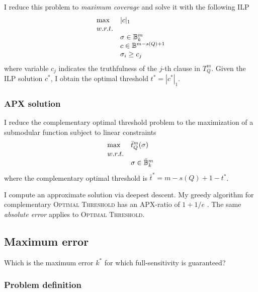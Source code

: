 I reduce this problem to \emph{maximum coverage} \citep{Vazirani2001} and solve it with the following ILP
\begin{equation}
\begin{array}{ll}
\text{max} & |c|_1					\\
w.r.t.							\\
& \sigma \in \mathbb {B}^m_k			\\
& c \in \mathbb {B}^{m - s(Q) + 1}		\\
& \sigma_i \geq c_j				\\
\end{array}
\end{equation}
where variable $c_j$ indicates the truthfulness of the $j$-th clause in $T_{Q}^{m}$. Given the ILP solution $c^*$, I obtain the optimal threshold $t^* = |c^*|_1$.

\subsubsection{APX solution}

I reduce the complementary optimal threshold problem to the maximization of a submodular function subject to linear constraints
\begin{equation}
\begin{array}{ll}
\text{max} & \bar{t}_{Q}^{m}(\sigma)		\\
w.r.t.								\\
& \sigma \in \bar{\mathbb {B}}^m_k			\\
\end{array}
\end{equation}
where the complementary optimal threshold is $\bar{t}^* = m - s(Q) + 1 - t^*$.

I compute an approximate solution via deepest descent.
My greedy algorithm for complementary \textsc{Optimal Threshold} has an APX-ratio of $1 + 1/e$ \citep{Vazirani2001}.
The same \emph{absolute error} applies to \textsc{Optimal Threshold}.

\subsection{Maximum error}

Which is the maximum error $k^*$ for which full-sensitivity is guaranteed?

\subsubsection{Problem definition}


